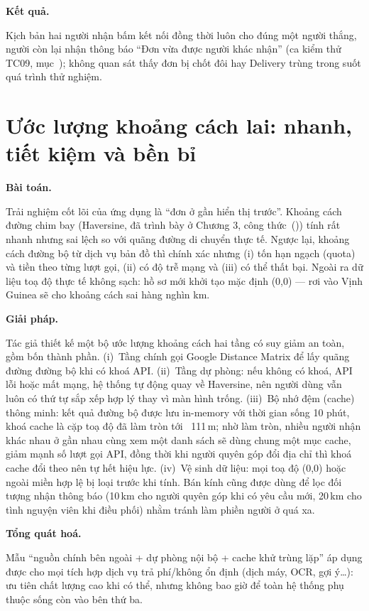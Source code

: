 \documentclass[../main.tex]{subfiles}%
\begin{document}
\textbf{Kết quả.} 

Kịch bản hai người nhận bấm kết nối đồng thời luôn cho đúng một người thắng, người còn lại nhận thông báo ``Đơn vừa được người khác nhận'' (ca kiểm thử TC09, mục~); không quan sát thấy đơn bị chốt đôi hay Delivery trùng trong suốt quá trình thử nghiệm.

\section{Ước lượng khoảng cách lai: nhanh, tiết kiệm và bền bỉ}
\label{section:5.2}

\textbf{Bài toán.} 

Trải nghiệm cốt lõi của ứng dụng là ``đơn ở gần hiển thị trước''. Khoảng cách đường chim bay (Haversine, đã trình bày ở Chương 3, công thức~()) tính rất nhanh nhưng sai lệch so với quãng đường di chuyển thực tế. Ngược lại, khoảng cách đường bộ từ dịch vụ bản đồ thì chính xác nhưng (i) tốn hạn ngạch (quota) và tiền theo từng lượt gọi, (ii) có độ trễ mạng và (iii) có thể thất bại. Ngoài ra dữ liệu toạ độ thực tế không sạch: hồ sơ mới khởi tạo mặc định (0,0) --- rơi vào Vịnh Guinea sẽ cho khoảng cách sai hàng nghìn km.

\textbf{Giải pháp.} 

Tác giả thiết kế một bộ ước lượng khoảng cách hai tầng có suy giảm an toàn, gồm bốn thành phần. (i)~Tầng chính gọi Google Distance Matrix để lấy quãng đường đường bộ khi có khoá API. (ii)~Tầng dự phòng: nếu không có khoá, API lỗi hoặc mất mạng, hệ thống tự động quay về Haversine, nên người dùng vẫn luôn có thứ tự sắp xếp hợp lý thay vì màn hình trống. (iii)~Bộ nhớ đệm (cache) thông minh: kết quả đường bộ được lưu in-memory với thời gian sống 10 phút, khoá cache là cặp toạ độ đã làm tròn tới ~111\,m; nhờ làm tròn, nhiều người nhận khác nhau ở gần nhau cùng xem một danh sách sẽ dùng chung một mục cache, giảm mạnh số lượt gọi API, đồng thời khi người quyên góp đổi địa chỉ thì khoá cache đổi theo nên tự hết hiệu lực. (iv)~Vệ sinh dữ liệu: mọi toạ độ (0,0) hoặc ngoài miền hợp lệ bị loại trước khi tính.
Bán kính cũng được dùng để lọc đối tượng nhận thông báo (10\,km cho người quyên góp khi có yêu cầu mới, 20\,km cho tình nguyện viên khi điều phối) nhằm tránh làm phiền người ở quá xa.

\textbf{Tổng quát hoá.} 

Mẫu ``nguồn chính bên ngoài + dự phòng nội bộ + cache khử trùng lặp'' áp dụng được cho mọi tích hợp dịch vụ trả phí/không ổn định (dịch máy, OCR, gợi ý\ldots): ưu tiên chất lượng cao khi có thể, nhưng không bao giờ để toàn hệ thống phụ thuộc sống còn vào bên thứ ba.
\end{document}
